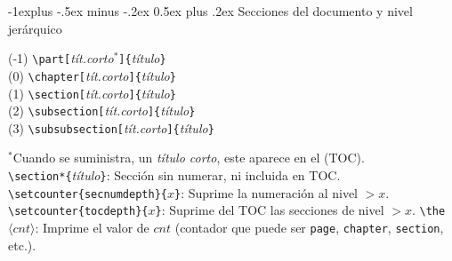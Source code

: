 \documentclass[10pt,landscape,a4paper]{article}
\makeatletter
\renewcommand{\section}{\@startsection{section}{1}{0mm}%
                                {-1ex plus -.5ex minus -.2ex}%
                                {0.5ex plus .2ex}%
                                {\normalfont\large\bfseries}}
\renewcommand{\subsection}{\@startsection{subsection}{2}{0mm}%
                                {-1explus -.5ex minus -.2ex}%
                                {0.5ex plus .2ex}%
                                {\normalfont\normalsize\bfseries}}
\renewcommand{\subsubsection}{\@startsection{subsubsection}{3}{0mm}%
                                {-1ex plus -.5ex minus -.2ex}%
                                {1ex plus .2ex}%
                                {\normalfont\small\bfseries}}
\makeatother
\begin{document}
\begin{multicols}{3}
\subsection{Secciones del documento y nivel jerárquico}
\begin{multicols}{2}
(-1) \verb!\part[!\emph{tít.corto$^*$}\verb!]{!\emph{título}\verb!}!  \\
(0) \verb!\chapter[!\emph{tít.corto}\verb!]{!\emph{título}\verb!}!  \\
(1) \verb!\section[!\emph{tít.corto}\verb!]{!\emph{título}\verb!}!  \\
(2) \verb!\subsection[!\emph{tít.corto}\verb!]{!\emph{título}\verb!}!  \\
(3) \verb!\subsubsection[!\emph{tít.corto}\verb!]{!\emph{título}\verb!}!  \\
\end{multicols}


$^*$Cuando se suministra, un \emph{título corto}, este aparece en el (TOC). \\[0.7mm]
\verb!\section*{!\emph{título}\verb!}!: Sección sin numerar, ni incluida en TOC.\\
\verb!\setcounter{secnumdepth}{!$x$\verb!}!: Suprime la numeración al nivel $>x$.
\verb!\setcounter{tocdepth}{!$x$\verb!}!: Suprime del TOC las secciones de nivel $>x$.
\verb!\the!$\langle cnt \rangle$: Imprime el valor de $cnt$ (contador que puede ser \texttt{page}, \texttt{chapter}, \texttt{section}, etc.).







\end{multicols}
\end{document}
